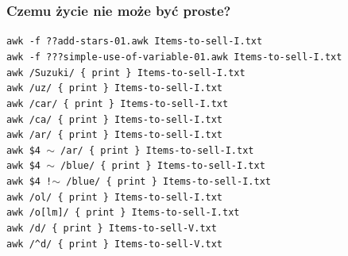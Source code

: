 \documentclass[10pt,t]{beamer}
\begin{document}
\begin{frame}
  \frametitle{Czemu życie nie może być proste?}


  \texttt{awk -f ??add-stars-01.awk Items-to-sell-I.txt} \\
  \texttt{awk -f ???simple-use-of-variable-01.awk Items-to-sell-I.txt} \\
  \texttt{awk /Suzuki/ \{ print \} Items-to-sell-I.txt} \\
  \texttt{awk /uz/ \{ print \} Items-to-sell-I.txt} \\
  \texttt{awk /car/ \{ print \} Items-to-sell-I.txt} \\
  \texttt{awk /ca/ \{ print \} Items-to-sell-I.txt} \\
  \texttt{awk /ar/ \{ print \} Items-to-sell-I.txt} \\
  \texttt{awk \$4 $\sim$ /ar/ \{ print \} Items-to-sell-I.txt} \\
  \texttt{awk \$4 $\sim$ /blue/ \{ print \} Items-to-sell-I.txt} \\
  \texttt{awk \$4 !$\sim$ /blue/ \{ print \} Items-to-sell-I.txt} \\
  \texttt{awk /ol/ \{ print \} Items-to-sell-I.txt} \\
  \texttt{awk /o[lm]/ \{ print \} Items-to-sell-I.txt} \\
  \texttt{awk /d/ \{ print \} Items-to-sell-V.txt} \\
  \texttt{awk /\^{}d/ \{ print \} Items-to-sell-V.txt} \\

\end{frame}
\end{document}
